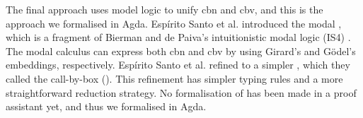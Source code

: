 The final approach uses model logic to unify \textsf{cbn} and \textsf{cbv}, and this is the approach we formalised in Agda.
Espírito Santo et al. \cite{espritosanto_et_al:LIPIcs:2019:10525} introduced the modal \lc \labox, which is a fragment of Bierman and de Paiva's intuitionistic modal logic (\textsf{IS4}) \cite{BiermanPaiva2000}.
The modal calculus \labox can express both \textsf{cbn} and \textsf{cbv} by using Girard's and Gödel's embeddings, respectively.
Espírito Santo et al. refined \labox to a simpler \lc, which they called the call-by-box \lc (\lab).
This refinement has simpler typing rules and a more straightforward reduction strategy.
No formalisation of \lab has been made in a proof assistant yet, and thus we formalised \lab in Agda.